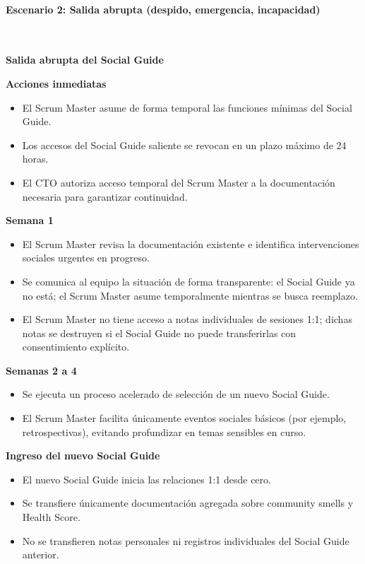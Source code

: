 \paragraph{Escenario 2: Salida abrupta (despido, emergencia, incapacidad)}\mbox{}\\[-0.3\baselineskip]

\begin{escenario}
    \textbf{Salida abrupta del Social Guide}

    \textbf{Acciones inmediatas}
    \begin{itemize}
        \item El Scrum Master asume de forma temporal las funciones mínimas del Social Guide.
        \item Los accesos del Social Guide saliente se revocan en un plazo máximo de 24 horas.
        \item El CTO autoriza acceso temporal del Scrum Master a la documentación necesaria para garantizar continuidad.
    \end{itemize}

    \textbf{Semana 1}
    \begin{itemize}
        \item El Scrum Master revisa la documentación existente e identifica intervenciones sociales urgentes en progreso.
        \item Se comunica al equipo la situación de forma transparente: el Social Guide ya no está; el Scrum Master asume temporalmente mientras se busca reemplazo.
        \item El Scrum Master no tiene acceso a notas individuales de sesiones 1:1; dichas notas se destruyen si el Social Guide no puede transferirlas con consentimiento explícito.
    \end{itemize}

    \textbf{Semanas 2 a 4}
    \begin{itemize}
        \item Se ejecuta un proceso acelerado de selección de un nuevo Social Guide.
        \item El Scrum Master facilita únicamente eventos sociales básicos (por ejemplo, retrospectivas), evitando profundizar en temas sensibles en curso.
    \end{itemize}

    \textbf{Ingreso del nuevo Social Guide}
    \begin{itemize}
        \item El nuevo Social Guide inicia las relaciones 1:1 desde cero.
        \item Se transfiere únicamente documentación agregada sobre community smells y Health Score.
        \item No se transfieren notas personales ni registros individuales del Social Guide anterior.
    \end{itemize}
\end{escenario}


